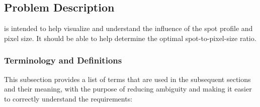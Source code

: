 \documentclass[12pt]{article}
\begin{document}
\subsection{Problem Description} \label{Sec_pd}

\progname{} is intended to help visualize and understand the influence of the 
spot profile and pixel size. It should be able to help determine the optimal 
spot-to-pixel-size ratio.

\subsubsection{Terminology and Definitions}

This subsection provides a list of terms that are used in the subsequent
sections and their meaning, with the purpose of reducing ambiguity and making it
easier to correctly understand the requirements:
\end{document}
